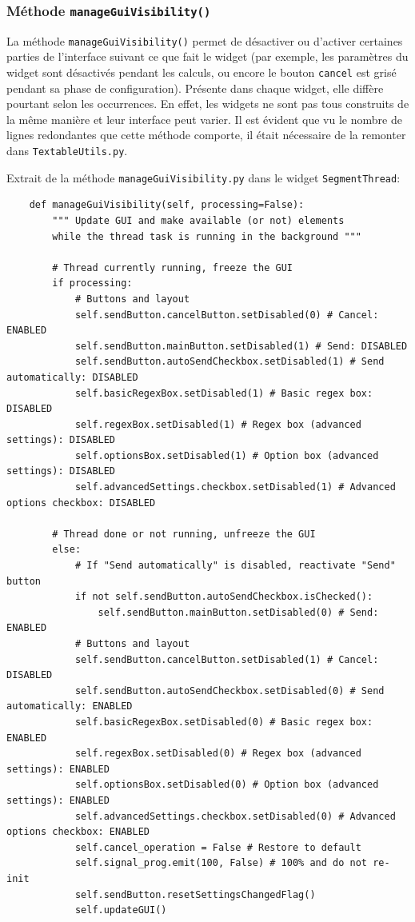 \documentclass{article}
\begin{document}
\subsubsection{Méthode \texttt{manageGuiVisibility()}}

La méthode \texttt{manageGuiVisibility()} permet de désactiver ou d'activer certaines parties de l'interface suivant ce que fait le widget (par exemple, les paramètres du widget sont désactivés pendant les calculs, ou encore le bouton \texttt{cancel} est grisé pendant sa phase de configuration). 
Présente dans chaque widget, elle diffère pourtant selon les occurrences. En effet, les widgets ne sont pas tous construits de la même manière et leur interface peut varier. Il est évident que vu le nombre de lignes redondantes que cette méthode comporte, il était nécessaire de la remonter dans \texttt{TextableUtils.py}.
\newline

Extrait de la méthode \texttt{manageGuiVisibility.py} dans le widget \texttt{SegmentThread}:

\begin{verbatim}
    def manageGuiVisibility(self, processing=False):
        """ Update GUI and make available (or not) elements
        while the thread task is running in the background """

        # Thread currently running, freeze the GUI
        if processing:
            # Buttons and layout
            self.sendButton.cancelButton.setDisabled(0) # Cancel: ENABLED
            self.sendButton.mainButton.setDisabled(1) # Send: DISABLED
            self.sendButton.autoSendCheckbox.setDisabled(1) # Send automatically: DISABLED
            self.basicRegexBox.setDisabled(1) # Basic regex box: DISABLED
            self.regexBox.setDisabled(1) # Regex box (advanced settings): DISABLED
            self.optionsBox.setDisabled(1) # Option box (advanced settings): DISABLED
            self.advancedSettings.checkbox.setDisabled(1) # Advanced options checkbox: DISABLED

        # Thread done or not running, unfreeze the GUI
        else:
            # If "Send automatically" is disabled, reactivate "Send" button
            if not self.sendButton.autoSendCheckbox.isChecked():
                self.sendButton.mainButton.setDisabled(0) # Send: ENABLED
            # Buttons and layout
            self.sendButton.cancelButton.setDisabled(1) # Cancel: DISABLED
            self.sendButton.autoSendCheckbox.setDisabled(0) # Send automatically: ENABLED
            self.basicRegexBox.setDisabled(0) # Basic regex box: ENABLED
            self.regexBox.setDisabled(0) # Regex box (advanced settings): ENABLED
            self.optionsBox.setDisabled(0) # Option box (advanced settings): ENABLED
            self.advancedSettings.checkbox.setDisabled(0) # Advanced options checkbox: ENABLED
            self.cancel_operation = False # Restore to default
            self.signal_prog.emit(100, False) # 100% and do not re-init
            self.sendButton.resetSettingsChangedFlag()
            self.updateGUI()
\end{verbatim}
\end{document}
